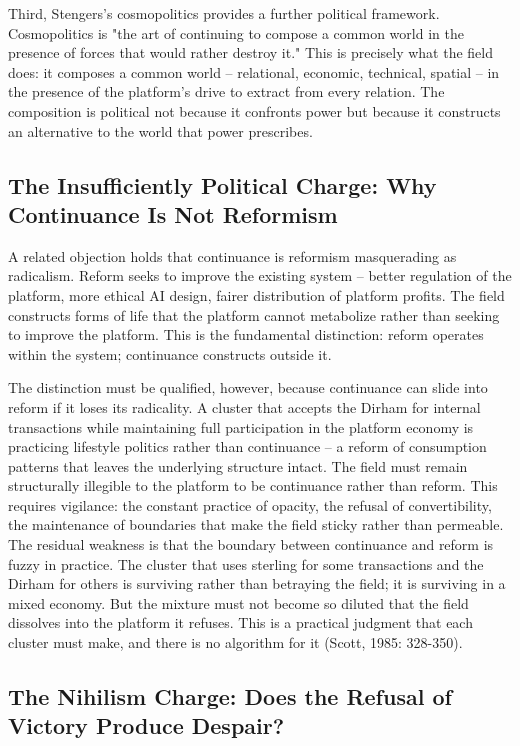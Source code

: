 Third, Stengers's cosmopolitics provides a further political framework. Cosmopolitics is "the art of continuing to compose a common world in the presence of forces that would rather destroy it." This is precisely what the field does: it composes a common world -- relational, economic, technical, spatial -- in the presence of the platform's drive to extract from every relation. The composition is political not because it confronts power but because it constructs an alternative to the world that power prescribes.

\subsection{The Insufficiently Political Charge: Why Continuance Is Not Reformism}

A related objection holds that continuance is reformism masquerading as radicalism. Reform seeks to improve the existing system -- better regulation of the platform, more ethical AI design, fairer distribution of platform profits. The field constructs forms of life that the platform cannot metabolize rather than seeking to improve the platform. This is the fundamental distinction: reform operates within the system; continuance constructs outside it.

The distinction must be qualified, however, because continuance can slide into reform if it loses its radicality. A cluster that accepts the Dirham for internal transactions while maintaining full participation in the platform economy is practicing lifestyle politics rather than continuance -- a reform of consumption patterns that leaves the underlying structure intact. The field must remain structurally illegible to the platform to be continuance rather than reform. This requires vigilance: the constant practice of opacity, the refusal of convertibility, the maintenance of boundaries that make the field sticky rather than permeable. The residual weakness is that the boundary between continuance and reform is fuzzy in practice. The cluster that uses sterling for some transactions and the Dirham for others is surviving rather than betraying the field; it is surviving in a mixed economy. But the mixture must not become so diluted that the field dissolves into the platform it refuses. This is a practical judgment that each cluster must make, and there is no algorithm for it (Scott, 1985: 328-350).

\subsection{The Nihilism Charge: Does the Refusal of Victory Produce Despair?}

